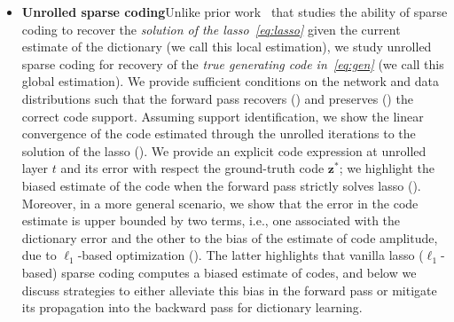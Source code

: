 \documentclass[10pt]{article} %
\newcommand{\z}{{\bm z}}
\begin{document}
%
\begin{itemize}[noitemsep, topsep=0pt, leftmargin=12pt]
\item {\bf Unrolled sparse coding}\quad Unlike prior work~\citep{malezieux2022understanding} that studies the ability of sparse coding to recover the \emph{solution of the lasso~\eqref{eq:lasso}} given the current estimate of the dictionary (we call this local estimation), we study unrolled sparse coding for recovery of the \emph{true generating code in~\eqref{eq:gen}} (we call this global estimation). We provide sufficient conditions on the network and data distributions such that the forward pass recovers () and preserves () the correct code support. Assuming support identification, we show the linear convergence of the code estimated through the unrolled iterations to the solution of the lasso (). We provide an explicit code expression at unrolled layer $t$ and its error with respect the ground-truth code $\z^{\ast}$; we highlight the biased estimate of the code when the forward pass strictly solves lasso (). Moreover, in a more general scenario, we show that the error in the code estimate is upper bounded by two terms, i.e., one associated with the dictionary error and the other to the bias of the estimate of code amplitude, due to $\ell_1$-based optimization (). The latter highlights that vanilla lasso ($\ell_1$-based) sparse coding computes a biased estimate of codes, and below we discuss strategies to either alleviate this bias in the forward pass or mitigate its propagation into the backward pass for dictionary learning.
%

\end{itemize}
\end{document}
